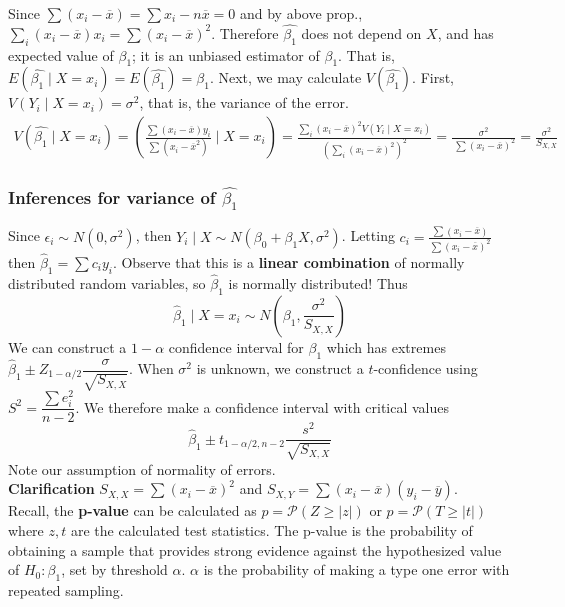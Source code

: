 \documentclass[12pt, a4paper]{article}
\theoremstyle{definition}
\newcommand{\PP}{\mathcal{P}}                         %
\newcommand{\eps}{\epsilon}
\newcommand{\ol}{\overline}
\newcommand{\f}{\frac}
\newcommand{\df}{\dfrac}
\newcommand{\abs}[1]{\left| #1 \right|}
\newcommand{\BB}[1]{\left(#1\right)}
\begin{document}
		Since $\sum(x_i - \ol{x}) = \sum x_i - n \ol{x} = 0$ and by above prop., $\sum_i (x_i - \ol{x}) x_i = \sum (x_i - \ol{x})^2 $. Therefore $\hat{\beta_1}$ does not depend on $X$, and has expected value of $\beta_1$; it is an unbiased estimator of $\beta_1$. That is, $	E(\hat{\beta_1} \mid X = x_i) = 	E(\hat{\beta_1} ) = \beta_1$. Next, we may calculate $V(\hat{\beta_1})$. First, $V(Y_i \mid X = x_i) = \sigma^2$, that is, the variance of the error.
		\begin{align*}
			V(\hat{\beta_1} \mid X = x_i) = \BB{\f{
					\sum(x_i - \ol{x})y_i}{
					\sum(x_i - \ol{x}^2)
				}
				\mid X = x_i
			} 
			= \f{
				\sum_i (x_i - \ol{x})^2V(Y_i \mid X = x_i)
			}{
				(\sum_i (x_i - \ol{x})^2)^2
			} 
			= \f{
			\sigma^2
			}{
			\	\sum (x_i - \ol{x})^2
			}
			=	\f{\sigma^2}{S_{X,X}}
		\end{align*}
	
		\subsubsection{Inferences for variance of $\hat{\beta_1}$}
	
		Since $\eps_i \sim N(0, \sigma^2)$, then $Y_i \mid X \sim N(\beta_0 + \beta_1 X, \sigma^2)$. Letting $c_i = \f{\sum(x_i - \ol{x})}{\sum(x_i - \ol{x})^2}$ then $\hat\beta_1 = \sum c_iy_i$. Observe that this is a {\bf linear combination} of normally distributed random variables, so $\hat\beta_1$ is normally distributed! Thus
		$$
			\hat\beta_1 \mid X = x_i \sim N\BB{\beta_1, \f{\sigma^2}{S_{X,X}}}
		$$
		We can construct a $1-\alpha$ confidence interval for $\beta_1$ which has extremes $\hat\beta_1 \pm Z_{1-\alpha/2} \df{\sigma}{\sqrt{S_{X,X}}}$. When $\sigma^2$ is unknown, we construct a $t$-confidence using $S^2 = \df{\sum e_i^2}{n-2}$.
		We therefore make a confidence interval with critical values
		$$
			\hat\beta_1 \pm t_{1-\alpha/2, n-2} \df{s^2}{\sqrt{S_{X,X}}}
		$$
		Note our assumption of normality of errors.\\
		
		{\bf Clarification} $S_{X,X} = \sum (x_i - \ol x)^2$ and $S_{X,Y} = \sum (x_i - \ol x)(y_i - \ol y)$.\\
		
		Recall, the {\bf p-value} can be calculated as $p = \PP(Z \geq \abs{z})$ or $p = \PP(T \geq \abs{t})$ where $z,t$ are the calculated test statistics. The p-value is the probability of obtaining a sample that provides strong evidence against the hypothesized value of $H_0: \beta_1$, set by threshold $\alpha$. $\alpha$ is the probability of making a type one error with repeated sampling.
		
\end{document}
